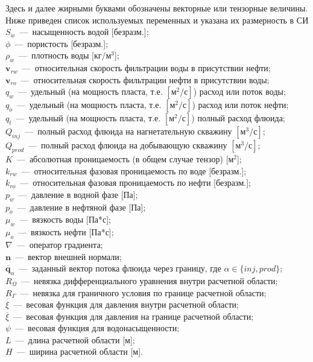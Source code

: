 Здесь и далее жирными буквами обозначены векторные или тензорные величины. Ниже приведен список
используемых переменных и указана их размерность в СИ\\
$S_w$~---~насыщенность водой [безразм.];\\
$\phi$~---~пористость [безразм.];\\
$\rho_w$~---~плотность воды [$\text{кг}/\text{м}^3$];\\
$\bm{v}_{rw}$~---~относительная скорость фильтрации воды в присутствии нефти;\\
$\bm{v}_{ro}$~---~относительная скорость фильтрации нефти в присутствии воды;\\
$q_w$~---~удельный (на мощность пласта, т.е. $[\text{м}^2/\text{с}]$) расход или поток воды;\\
$q_o$~---~удельный (на мощность пласта, т.е. $[\text{м}^2/\text{с}]$) расход или поток нефти;\\ 
$q_t$~---~удельный (на мощность пласта, т.е. $[\text{м}^2/\text{с}]$) полный расход флюида;\\
$Q_{inj}$~---~полный расход флюида на нагнетательную скважину $[\text{м}^3/\text{с}]$;\\
$Q_{prod}$~---~полный расход флюида на добывающую скважину $[\text{м}^3/\text{с}]$;\\
$K$~---~абсолютная проницаемость (в общем случае тензор) [$\text{м}^2$];\\
$k_{rw}$~---~относительная фазовая проницаемость по воде [безразм.];\\
$k_{ro}$~---~относительная фазовая проницаемость по нефти [безразм.];\\
$p_w$~---~давление в водной фазе [Па];\\
$p_o$~---~давление в нефтяной фазе [Па];\\
$\mu_w$~---~вязкость воды [Па*с];\\
$\mu_o$~---~вязкость нефти [Па*с];\\
$\nabla$~---~оператор градиента;\\
$\bm{n}$~---~вектор внешней нормали;\\
$\overline{\bm{q}}_\alpha$~---~заданный вектор потока флюида через границу, где $\alpha \in \{inj,prod\}$;\\
$R_\Omega$~---~невязка дифференциального уравнения внутри расчетной области;\\
$R_\Gamma$~---~невязка для граничного условия по границе расчетной области;\\
$\xi$~---~весовая функция для давления внутри расчетной области;\\
$\overline{\xi}$~---~весовая функция для давления на границе расчетной области;\\
$\psi$~---~весовая функция для водонасыщенности;\\
$L$~---~длина расчетной области [м];\\
$H$~---~ширина расчетной области [м].


